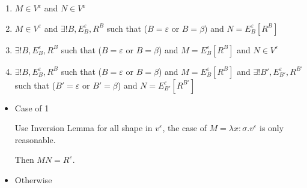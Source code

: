 \begin{itemize}
\begin{itemize}
	      	      \begin{enumerate}
	      	      	\item $ M \in V^\varepsilon$ and $ N \in V^\varepsilon$
	      	      	\item $ M \in V^\varepsilon$ and $\exists ! B, E^\varepsilon_B, R^B$ such that ($B = \varepsilon$ or $B = \beta$) and $N = E^\varepsilon_B[R^B]$
	      	      	\item $\exists ! B, E^\varepsilon_B, R^B$ such that ($B = \varepsilon$ or $B = \beta$) and $M = E^\varepsilon_B[R^B]$ and $ N \in V^\varepsilon$
	      	      	\item $\exists ! B, E^\varepsilon_B, R^B$ such that ($B = \varepsilon$ or $B = \beta$) and $M = E^\varepsilon_B[R^B]$ and $\exists ! B', E^\varepsilon_{B'}, R^{B'}$ such that ($B' = \varepsilon$ or $B' = \beta$) and $N = E^\varepsilon_{B'}[R^{B'}]$
	      	      \end{enumerate}
	      	      	      	      	      	      	      	      	      	      	      	      	      	      	      	      		      	      	      	      	      	      	      	      
	      	      \begin{itemize}
	      	      	\item Case of 1
	      	      	      	      	      	      	      	      	      	      	      	      	      	      	      	      	      	      	      	      	      	      	      	      		      	      	      	      	      	      	      	      	      	      	      	      
	      	      	      Use Inversion Lemma for all shape in $v^\varepsilon$, the case of $ M = \lambda x:\sigma.v^\varepsilon$ is only reasonable.
	      	      	      	      	      	      	      	      	      	      	      	      	      	      	      	      	      	      	      	      	      	      	      	      		      	      	      	      	      	      	      	      	      	      	      	      
	      	      	      Then $M N = R^\varepsilon$.
	      	      	      	      	      	      	      	      	      	      	      	      	      	      	      	      	      	      	      	      	      	      	      	      		      	      	      	      	      	      	      	      	      	      	      	      
	      	      	\item Otherwise
	      	      	      	      	      	      	      	      	      	      	      	      	      	      	      	      	      	      	      	      	      	      	      	      		      	      	      	      	      	      	      	      	      	      	      	      

\end{itemize}
\end{itemize}
\end{itemize}
